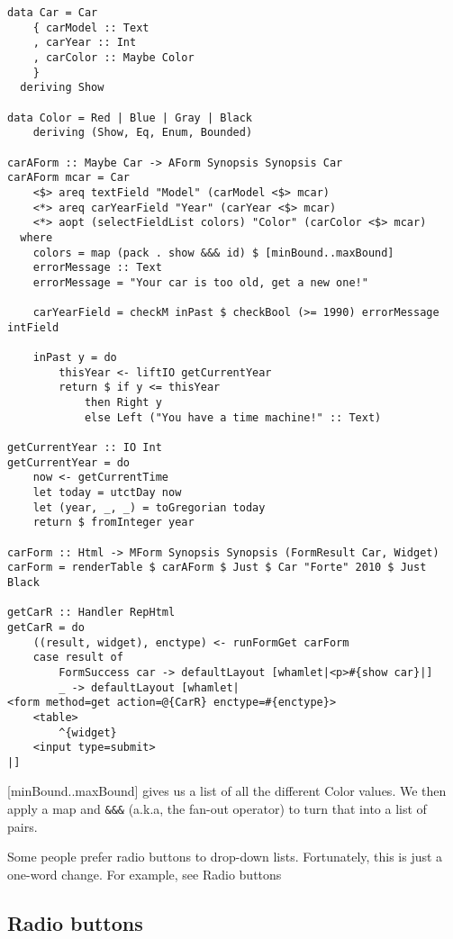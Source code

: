 \begin{lstlisting}
data Car = Car
    { carModel :: Text
    , carYear :: Int
    , carColor :: Maybe Color
    }
  deriving Show

data Color = Red | Blue | Gray | Black
    deriving (Show, Eq, Enum, Bounded)

carAForm :: Maybe Car -> AForm Synopsis Synopsis Car
carAForm mcar = Car
    <$> areq textField "Model" (carModel <$> mcar)
    <*> areq carYearField "Year" (carYear <$> mcar)
    <*> aopt (selectFieldList colors) "Color" (carColor <$> mcar)
  where
    colors = map (pack . show &&& id) $ [minBound..maxBound]
    errorMessage :: Text
    errorMessage = "Your car is too old, get a new one!"

    carYearField = checkM inPast $ checkBool (>= 1990) errorMessage intField

    inPast y = do
        thisYear <- liftIO getCurrentYear
        return $ if y <= thisYear
            then Right y
            else Left ("You have a time machine!" :: Text)

getCurrentYear :: IO Int
getCurrentYear = do
    now <- getCurrentTime
    let today = utctDay now
    let (year, _, _) = toGregorian today
    return $ fromInteger year

carForm :: Html -> MForm Synopsis Synopsis (FormResult Car, Widget)
carForm = renderTable $ carAForm $ Just $ Car "Forte" 2010 $ Just Black

getCarR :: Handler RepHtml
getCarR = do
    ((result, widget), enctype) <- runFormGet carForm
    case result of
        FormSuccess car -> defaultLayout [whamlet|<p>#{show car}|]
        _ -> defaultLayout [whamlet|
<form method=get action=@{CarR} enctype=#{enctype}>
    <table>
        ^{widget}
    <input type=submit>
|]
\end{lstlisting}

[minBound..maxBound] gives us a list of all the different Color values. We then apply a
map and \lstinline'&&&' (a.k.a, the fan-out operator) to turn that into a list of pairs.

Some people prefer radio buttons to drop-down lists. Fortunately, this is just a one-word
change. For example, see Radio buttons

\subsection{Radio buttons}

